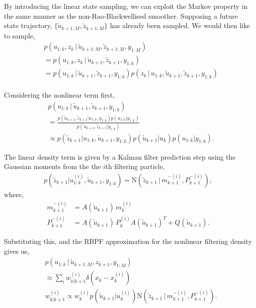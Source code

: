 \documentclass[twocolumn]{autart}    %
\begin{document}
By introducing the linear state sampling, we can exploit the Markov property in the same manner as the non-Rao-Blackwellised smoother. Supposing a future state trajectory, $\{ \tilde{u}_{k+1:M}, \tilde{z}_{k+1:M} \}$ has already been sampled. We would then like to sample,
%
\begin{equation}
\begin{split}
  &p(u_{1:k}, z_k\,|\,\tilde{u}_{k+1:M}, \tilde{z}_{k+1:M},y_{1:M}) \\
  &= p(u_{1:k}, z_k\,|\,\tilde{u}_{k+1}, \tilde{z}_{k+1},y_{1:k}) \\
  &= p(u_{1:k}\,|\,\tilde{u}_{k+1},\tilde{z}_{k+1},y_{1:k}) p(z_k\,|\, u_{1:k}, \tilde{u}_{k+1}, \tilde{z}_{k+1},y_{1:k}) \\
\end{split}
\label{eq:linsampfact}
\end{equation}

Considering the nonlinear term first,
%
\begin{equation}
\begin{split}
  &p(u_{1:k}\,|\,\tilde{u}_{k+1},\tilde{z}_{k+1},y_{1:k}) \\
  &= \frac{ p(\tilde{u}_{k+1}, \tilde{z}_{k+1} | u_{1:k}, y_{1:k}) p(u_{1:k}|y_{1:k}) }{ p(\tilde{u}_{k+1}, \tilde{z}_{k+1} | y_{1:k}) } \\
  &\propto p(\tilde{z}_{k+1} | u_{1:k}, \tilde{u}_{k+1}, y_{1:k}) p(\tilde{u}_{k+1} | u_k) p(u_{1:k}|y_{1:k})     .
\end{split}
\end{equation}

The linear density term is given by a Kalman filter prediction step using the Gaussian moments from the the $i$th filtering particle,
%
\begin{equation}
\begin{split}
  p(\tilde{z}_{k+1} | u_{1:k}^{(i)}, \tilde{u}_{k+1}, y_{1:k}) = \mathrm{N}(\tilde{z}_{k+1}\,|\, m^{-(i)}_{k+1}, P^{-(i)}_{k+1}), 
\end{split}
\end{equation}
where,
%
\begin{equation}
\begin{split}
 m^{-(i)}_{k+1} &= A(\tilde{u}_{k+1}) \, m^{(i)}_{k} \\
 P^{-(i)}_{k+1} &= A(\tilde{u}_{k+1}) \, P^{(i)}_{k} A(\tilde{u}_{k+1})^T + Q(\tilde{u}_{k+1})     .
\end{split}
\end{equation}

Substituting this, and the RBPF approximation for the nonlinear filtering density gives us,
%
\begin{equation}
\begin{split}
  &p(u_{1:k}\,|\,\tilde{u}_{k+1:M},z_{k+1},y_{1:M}) \\
  &\approx \sum_i w^{(i)}_{k|k+1} \delta(x_k - x_k^{(i)}) \\
  &w^{(i)}_{k|k+1} \propto w_k^{(i)} p(\tilde{u}_{k+1} | u_k^{(i)}) \mathrm{N}(\tilde{z}_{k+1}\,|\, m^{-(i)}_{k+1}, P^{-(i)}_{k+1})     .
\end{split}
\end{equation}
\end{document}
